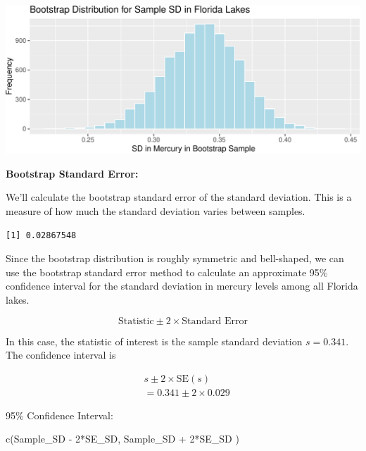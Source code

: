 \documentclass[
  letterpaper,
  DIV=11,
  numbers=noendperiod]{scrreprt}
\newenvironment{Shaded}{\begin{snugshade}}{\end{snugshade}}
\newcommand{\DecValTok}[1]{\textcolor[rgb]{0.68,0.00,0.00}{#1}}
\newcommand{\FunctionTok}[1]{\textcolor[rgb]{0.28,0.35,0.67}{#1}}
\newcommand{\NormalTok}[1]{\textcolor[rgb]{0.00,0.23,0.31}{#1}}
\newcommand{\OtherTok}[1]{\textcolor[rgb]{0.00,0.23,0.31}{#1}}
\newcommand{\SpecialCharTok}[1]{\textcolor[rgb]{0.37,0.37,0.37}{#1}}
\begin{document}
\includegraphics{Ch3_files/figure-pdf/unnamed-chunk-82-1.pdf}

\textbf{Bootstrap Standard Error:}

We'll calculate the bootstrap standard error of the standard deviation.
This is a measure of how much the standard deviation varies between
samples.

\begin{Shaded}
\end{Shaded}

\begin{verbatim}
[1] 0.02867548
\end{verbatim}

Since the bootstrap distribution is roughly symmetric and bell-shaped,
we can use the bootstrap standard error method to calculate an
approximate 95\% confidence interval for the standard deviation in
mercury levels among all Florida lakes.

\[
\text{Statistic} \pm 2\times\text{Standard Error}
\]

In this case, the statistic of interest is the sample standard deviation
\(s=0.341\). The confidence interval is

\[
\begin{aligned}
& s \pm 2\times\text{SE}(s) \\
& = 0.341 \pm 2\times{0.029}
\end{aligned}
\]

95\% Confidence Interval:

\begin{Shaded}
\begin{Highlighting}[]
\FunctionTok{c}\NormalTok{(Sample\_SD }\SpecialCharTok{{-}} \DecValTok{2}\SpecialCharTok{*}\NormalTok{SE\_SD, Sample\_SD }\SpecialCharTok{+} \DecValTok{2}\SpecialCharTok{*}\NormalTok{SE\_SD        ) }
\end{Highlighting}
\end{Shaded}
\end{document}
